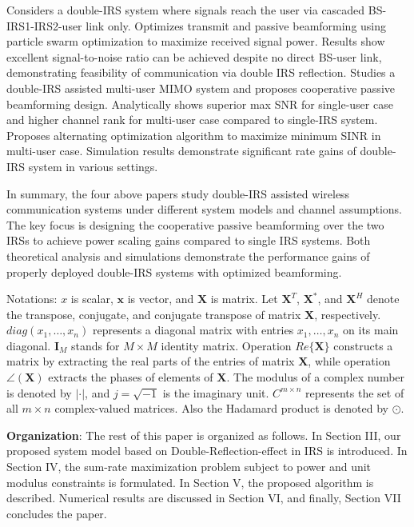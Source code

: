 \documentclass{article}
\newcommand{\vect}[1]{\mathbf{#1}} %
\newcommand{\mat}[1]{\mathbf{#1}} %
\begin{document}
\cite{10} Considers a double-IRS system where signals reach the user via cascaded BS-IRS1-IRS2-user link only.
Optimizes transmit and passive beamforming using particle swarm optimization to maximize received signal power.
Results show excellent signal-to-noise ratio can be achieved despite no direct BS-user link, demonstrating feasibility of communication via double IRS reflection.
\cite{11} Studies a double-IRS assisted multi-user MIMO system and proposes cooperative passive beamforming design. Analytically shows superior max SNR for single-user case and higher channel rank for multi-user case compared to single-IRS system. Proposes alternating optimization algorithm to maximize minimum SINR in multi-user case. Simulation results demonstrate significant rate gains of double-IRS system in various settings.
\par In summary, the four above papers study double-IRS assisted wireless communication systems under different system models and channel assumptions. The key focus is designing the cooperative passive beamforming over the two IRSs to achieve power scaling gains compared to single IRS systems. Both theoretical analysis and simulations demonstrate the performance gains of properly deployed double-IRS systems with optimized beamforming.

\par Notations: $x$ is scalar, $\vect{x}$ is vector, and $\mat{X}$ is matrix. Let $\mat{X}^T$, $\mat{X}^*$, and $\mat{X}^H$ denote the transpose, conjugate, and conjugate transpose of matrix $\mat{X}$, respectively. ${diag} (x_1, \ldots, x_n)$ represents a diagonal matrix with entries $x_1, \ldots, x_n$ on its main diagonal. $\mat{I}_M$ stands for $M \times M$ identity matrix. Operation ${Re}\{\mat{X}\}$ constructs a matrix by extracting the real parts of the entries of matrix $\mat{X}$, while operation $\angle(\mat{X})$ extracts the phases of elements of $\mat{X}$. The modulus of a complex number is denoted by $|\cdot|$, and $j = \sqrt{-1}$ is the imaginary unit. ${C}^{m \times n}$ represents the set of all $m \times n$ complex-valued matrices. Also the Hadamard product is denoted by $\odot$.
\par {\bf Organization}: The rest of this paper is organized as follows. 
In Section III, our proposed system model based on Double-Reflection-effect in IRS is introduced.
In Section IV, the sum-rate maximization problem subject to
power and unit modulus constraints is formulated.
In Section V, the proposed algorithm is described.
Numerical results are discussed in Section VI, and finally,
Section VII concludes the paper.
\end{document}
